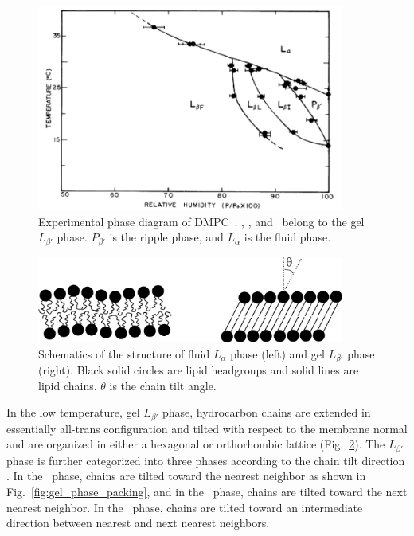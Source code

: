 \begin{figure}[htbp]
  \centering
  \includegraphics[width=0.9\textwidth]{figures/smith_phase_diagram}
  \caption[Experimental phase diagram of DMPC~\cite{ref:Smith88}]
  {Experimental phase diagram of DMPC~\cite{ref:Smith88}.
  \LbetaI, \LbetaL, and \LbetaF\ belong to the gel $L_{\beta'}$ phase. $P_{\beta'}$ is 
  the ripple phase, and $L_\alpha$ is the fluid phase.}
  \label{fig:phase_diagram}
\end{figure}

\begin{figure}[htbp]
  \centering
  \includegraphics[width=0.9\textwidth]{figures/various_phases}
  \caption[Schematics of the structure of fluid $L_\alpha$ phase (left) and 
  gel $L_{\beta'}$ phase (right)]
  {Schematics of the structure of fluid $L_\alpha$ phase (left) and 
  gel $L_{\beta'}$ phase (right). Black solid circles are lipid headgroups 
  and solid lines are lipid chains. $\theta$ is the chain tilt angle.}
  \label{fig:various_phases}
\end{figure}

In the low temperature, gel $L_{\beta'}$
phase, hydrocarbon chains are extended in essentially all-trans configuration
and tilted with respect to the membrane
normal \cite{ref:Tardieu73} and are organized in either a hexagonal 
or orthorhombic lattice (Fig.~\ref{fig:various_phases}). 
The $L_{\beta'}$ phase is further categorized into three phases according to the 
chain tilt direction \cite{ref:Smith88,ref:Tristram93,Tristram-Nagle02}. 
In the \LbetaI\ phase, chains are tilted toward the 
nearest neighbor as shown in Fig.~\ref{fig:gel_phase_packing}, and
in the \LbetaF\ phase, chains are tilted toward the next nearest neighbor.
In the \LbetaL\ phase, chains are tilted toward an intermediate direction
between nearest and next nearest neighbors.

